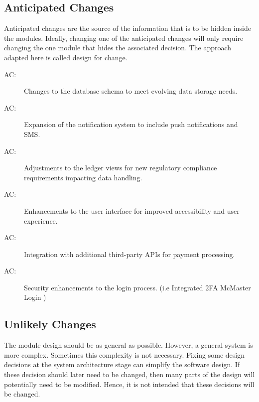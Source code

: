 \documentclass[12pt, titlepage]{article}
\newcounter{acnum}
\newcommand{\actheacnum}{AC\theacnum}
\begin{document}
\subsection{Anticipated Changes} \label{SecAchange}

Anticipated changes are the source of the information that is to be hidden
inside the modules. Ideally, changing one of the anticipated changes will only
require changing the one module that hides the associated decision. The approach
adapted here is called design for
change.

\begin{description}
\item[ \actheacnum \label{acDataSchema}:] Changes to the database schema to meet evolving data storage needs.
\item[ \actheacnum \label{acNotifications}:] Expansion of the notification system to include push notifications and SMS.
\item[ \actheacnum \label{acCompliance}:] Adjustments to the ledger views for new regulatory compliance requirements impacting data handling.
\item[ \actheacnum \label{acUI}:] Enhancements to the user interface for improved accessibility and user experience.
\item[ \actheacnum \label{acIntegration}:] Integration with additional third-party APIs for payment processing.
\item[ \actheacnum \label{acLogin}:] Security enhancements to the login process. (i.e Integrated 2FA McMaster Login )
\end{description}


\subsection{Unlikely Changes} \label{SecUchange}

The module design should be as general as possible. However, a general system is
more complex. Sometimes this complexity is not necessary. Fixing some design
decisions at the system architecture stage can simplify the software design. If
these decision should later need to be changed, then many parts of the design
will potentially need to be modified. Hence, it is not intended that these
decisions will be changed.
\end{document}
